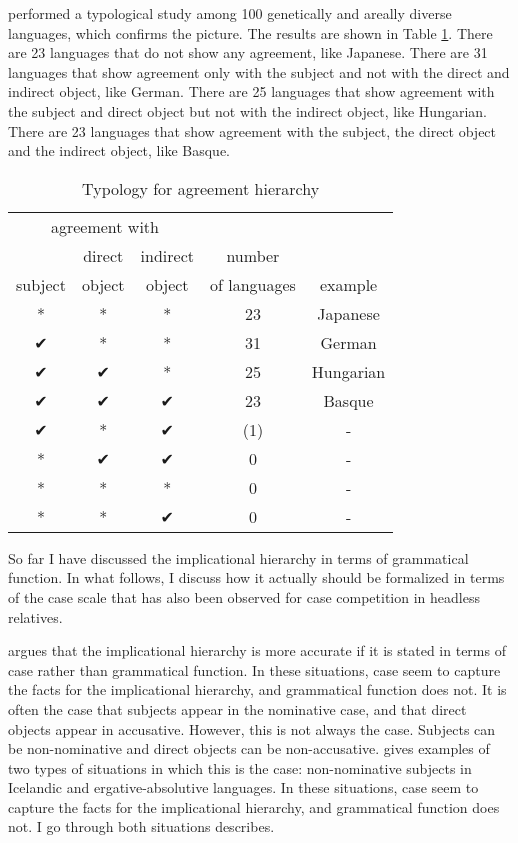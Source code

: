 \citet{gilligan1987} performed a typological study among 100 genetically and areally diverse languages, which confirms the picture. The results are shown in Table \ref{tbl:agr-typo}. There are 23 languages that do not show any agreement, like Japanese. There are 31 languages that show agreement only with the subject and not with the direct and indirect object, like German. There are 25 languages that show agreement with the subject and direct object but not with the indirect object, like Hungarian. There are 23 languages that show agreement with the subject, the direct object and the indirect object, like Basque.

 \begin{table}[H]
   \center
   \caption {Typology for agreement hierarchy}
     \begin{tabular}[t]{ccccc}
       \toprule
           \multicolumn{3}{c}{agreement with} &              &         \\
       \cmidrule{1-3}
                    & direct & indirect       & number       &         \\
           subject  & object & object         & of languages & example \\
       \cmidrule{1-3} \cmidrule{4-4} \cmidrule{5-5}
           *    & * & * & 23  & Japanese    \\
           ✔    & * & * & 31  & German     \\
           ✔    & ✔ & * & 25  & Hungarian  \\
           ✔    & ✔ & ✔ & 23  & Basque     \\
           ✔    & * & ✔ & (1) & -          \\
           {*}  & ✔ & ✔ & 0   & -          \\
           {*}  & * & * & 0   & -          \\
           {*}  & * & ✔ & 0   & -          \\
       \bottomrule
     \end{tabular}
     \label{tbl:agr-typo}
 \end{table}

So far I have discussed the implicational hierarchy in terms of grammatical function. In what follows, I discuss how it actually should be formalized in terms of the case scale that has also been observed for case competition in headless relatives.

\citet{bobaljik2006} argues that the implicational hierarchy is more accurate if it is stated in terms of case rather than grammatical function. In these situations, case seem to capture the facts for the implicational hierarchy, and grammatical function does not. It is often the case that subjects appear in the nominative case, and that direct objects appear in accusative. However, this is not always the case. Subjects can be non-nominative and direct objects can be non-accusative. \citeauthor{bobaljik2006} gives examples of two types of situations in which this is the case: non-nominative subjects in Icelandic and ergative-absolutive languages. In these situations, case seem to capture the facts for the implicational hierarchy, and grammatical function does not. I go through both situations \citeauthor{bobaljik2006} describes.

